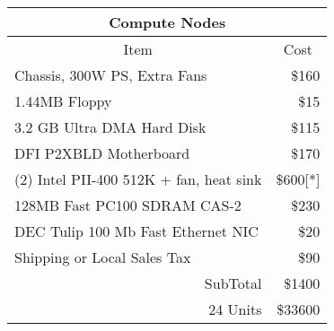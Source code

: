 





\newpage

\begin{tabular}{|l|r|} \hline \hline
\multicolumn{2}{|c|}{Compute Nodes} \\ \hline \hline
\multicolumn{1}{|c}{Item} & \multicolumn{1}{c|}{Cost} \\ \hline
Chassis, 300W PS, Extra Fans & \$160 \\ \hline
1.44MB Floppy & \$15 \\ \hline
3.2 GB Ultra DMA Hard Disk & \$115 \\ \hline
DFI P2XBLD Motherboard & \$170 \\ \hline
(2) Intel PII-400 512K + fan, heat sink & \$600[*] \\ \hline
128MB Fast PC100 SDRAM CAS-2 & \$230 \\ \hline
DEC Tulip 100 Mb Fast Ethernet NIC & \$20 \\ \hline
Shipping or Local Sales Tax & \$90 \\ \hline
\multicolumn{1}{|r|}{SubTotal} & \multicolumn{1}{r|}{\$1400} \\ \hline
\multicolumn{1}{|r|}{24 Units} & \multicolumn{1}{r|}{\$33600} \\ \hline

\end{tabular}

\bigskip

